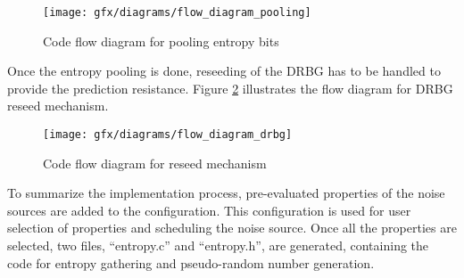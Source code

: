 \begin{figure}[!h]
	\centering
	\texttt{[image: gfx/diagrams/flow\_diagram\_pooling]}
	\caption{Code flow diagram for pooling entropy bits}
	\label{fig:5:9}
\end{figure}

Once the entropy pooling is done, reseeding of the DRBG has to be handled to provide the prediction resistance. Figure \ref{fig:5:10} illustrates the flow diagram for DRBG reseed mechanism.
\begin{figure}[!h]
	\centering
	\texttt{[image: gfx/diagrams/flow\_diagram\_drbg]}
	\caption{Code flow diagram for reseed mechanism}
	\label{fig:5:10}
\end{figure}

To summarize the implementation process, pre-evaluated properties of the noise sources are added to the configuration. This configuration is used for user selection of properties and scheduling the noise source. Once all the properties are selected, two files, “entropy.c” and “entropy.h”, are generated, containing the code for entropy gathering and pseudo-random number generation.

%
%
